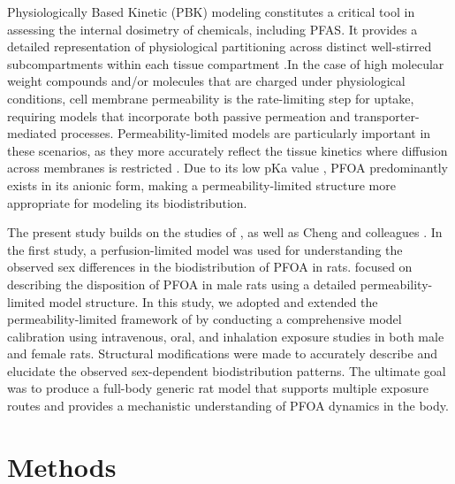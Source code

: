 \documentclass[preprint,12pt,authoryear]{elsarticle}
\begin{document}
Physiologically Based Kinetic (PBK) modeling constitutes a critical tool in assessing the internal dosimetry of chemicals, including PFAS. It provides a detailed representation of physiological partitioning across distinct well-stirred subcompartments within each tissue compartment \citep{ruark_2020}.In the case of high molecular weight compounds and/or molecules that are charged under physiological conditions, cell membrane permeability is the rate-limiting step for uptake, requiring models that incorporate both passive permeation and transporter-mediated processes. Permeability-limited models are particularly important in these scenarios, as they more accurately reflect the tissue kinetics where diffusion across membranes is restricted \citep{korzekwa_2022}. Due to its low pKa value \citep{burns_2008}, PFOA predominantly exists in its anionic form, making a permeability-limited structure more appropriate for modeling its biodistribution.  

The present study builds on the studies of \citet{worley_2015}, as well as Cheng and colleagues \citep{cheng_2017, cheng_2021}. In the first study, a perfusion-limited model was used for understanding the observed sex differences in the biodistribution of PFOA in rats. \citet{cheng_2017} focused on describing the disposition of PFOA in male rats using a detailed permeability-limited model structure. In this study, we adopted and extended the permeability-limited framework of \citet{cheng_2017} by conducting a comprehensive model calibration using intravenous, oral, and inhalation exposure studies in both male and female rats. Structural modifications were made to accurately describe and elucidate the observed sex-dependent biodistribution patterns. The ultimate goal was to produce a full-body generic rat model that supports multiple exposure routes and provides a mechanistic understanding of PFOA dynamics in the body.


 \section{Methods}
\end{document}
